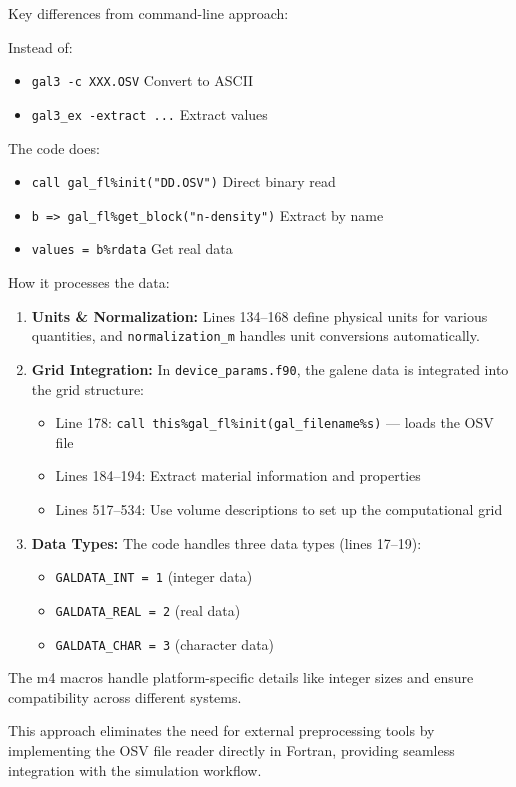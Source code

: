 Key differences from command-line approach:

Instead of:
\begin{itemize}
  \item \texttt{gal3 -c XXX.OSV} \hspace{1em} Convert to ASCII
  \item \texttt{gal3\_ex -extract ...} \hspace{1em} Extract values
\end{itemize}

The code does:
\begin{itemize}
  \item \texttt{call gal\_fl\%init("DD.OSV")} \hspace{1em} Direct binary read
  \item \texttt{b => gal\_fl\%get\_block("n-density")} \hspace{1em} Extract by name
  \item \texttt{values = b\%rdata} \hspace{1em} Get real data
\end{itemize}

How it processes the data:

\begin{enumerate}
  \item \textbf{Units \& Normalization:} Lines 134--168 define physical units for various quantities, and \texttt{normalization\_m} handles unit conversions automatically.
  \item \textbf{Grid Integration:} In \texttt{device\_params.f90}, the galene data is integrated into the grid structure:
    \begin{itemize}
      \item Line 178: \texttt{call this\%gal\_fl\%init(gal\_filename\%s)} --- loads the OSV file
      \item Lines 184--194: Extract material information and properties
      \item Lines 517--534: Use volume descriptions to set up the computational grid
    \end{itemize}
  \item \textbf{Data Types:} The code handles three data types (lines 17--19):
    \begin{itemize}
      \item \texttt{GALDATA\_INT = 1} (integer data)
      \item \texttt{GALDATA\_REAL = 2} (real data)
      \item \texttt{GALDATA\_CHAR = 3} (character data)
    \end{itemize}
\end{enumerate}

The m4 macros handle platform-specific details like integer sizes and ensure compatibility across different systems.

This approach eliminates the need for external preprocessing tools by implementing the OSV file reader directly in Fortran, providing seamless integration with the simulation workflow.
